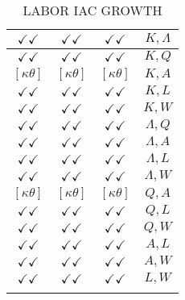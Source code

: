 \documentclass[a4paper,10pt]{article}
\begin{document}
\begin{longtable}{|c|c|c|c|}
\hline
$\checkmark\checkmark$ & $\checkmark\checkmark$ & $\checkmark\checkmark$ & ${K},{\Lambda}$ \\
\hline
$\checkmark\checkmark$ & $\checkmark\checkmark$ & $\checkmark\checkmark$ & ${K},{Q}$ \\
\hline
$[\kappa \theta ]$ & $[\kappa \theta ]$ & $[\kappa \theta ]$ & ${K},{A}$ \\
\hline
$\checkmark\checkmark$ & $\checkmark\checkmark$ & $\checkmark\checkmark$ & ${K},{L}$ \\
\hline
$\checkmark\checkmark$ & $\checkmark\checkmark$ & $\checkmark\checkmark$ & ${K},{W}$ \\
\hline
$\checkmark\checkmark$ & $\checkmark\checkmark$ & $\checkmark\checkmark$ & ${\Lambda},{Q}$ \\
\hline
$\checkmark\checkmark$ & $\checkmark\checkmark$ & $\checkmark\checkmark$ & ${\Lambda},{A}$ \\
\hline
$\checkmark\checkmark$ & $\checkmark\checkmark$ & $\checkmark\checkmark$ & ${\Lambda},{L}$ \\
\hline
$\checkmark\checkmark$ & $\checkmark\checkmark$ & $\checkmark\checkmark$ & ${\Lambda},{W}$ \\
\hline
$[\kappa \theta ]$ & $[\kappa \theta ]$ & $[\kappa \theta ]$ & ${Q},{A}$ \\
\hline
$\checkmark\checkmark$ & $\checkmark\checkmark$ & $\checkmark\checkmark$ & ${Q},{L}$ \\
\hline
$\checkmark\checkmark$ & $\checkmark\checkmark$ & $\checkmark\checkmark$ & ${Q},{W}$ \\
\hline
$\checkmark\checkmark$ & $\checkmark\checkmark$ & $\checkmark\checkmark$ & ${A},{L}$ \\
\hline
$\checkmark\checkmark$ & $\checkmark\checkmark$ & $\checkmark\checkmark$ & ${A},{W}$ \\
\hline
$\checkmark\checkmark$ & $\checkmark\checkmark$ & $\checkmark\checkmark$ & ${L},{W}$ \\
\hline
\caption{LABOR IAC GROWTH}
\label{table:MyTableLabel}
\end{longtable}
\end{document}
